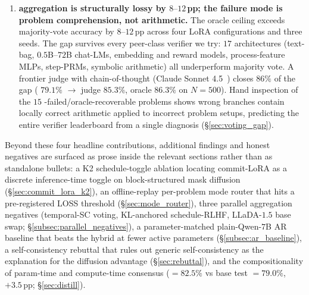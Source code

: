 \begin{enumerate}
          full-response training; full-response training alone
          (with last-block-only commit) adds $+0.0$\,pp.  Two
          design errors mask each other; block coverage is the
          dominant lever (\S\ref{sec:distill}).
    \item \textbf{\cmaj{} aggregation is structurally lossy by
          $8\text{--}12$\,pp; the failure mode is problem
          comprehension, not arithmetic.}  The oracle ceiling
          exceeds majority-vote accuracy by $8\text{--}12$\,pp
          across four LoRA configurations and three seeds.  The
          gap survives every peer-class verifier we try: $17$
          architectures (text-bag, $0.5$B--$72$B chat-LMs,
          embedding and reward models, process-feature MLPs,
          step-PRMs, symbolic arithmetic) all underperform
          majority vote.  A frontier judge with chain-of-thought
          (Claude Sonnet 4.5~\citep{anthropic2025sonnet}) closes
          $86\%$ of the gap (\cmaj{} $79.1\%$ $\to$ judge
          $85.3\%$, oracle $86.3\%$ on $N{=}500$).  Hand inspection
          of the $15$ \cmaj{}-failed/oracle-recoverable problems
          shows wrong branches contain locally correct arithmetic
          applied to incorrect problem setups, predicting the
          entire verifier leaderboard from a single diagnosis
          (\S\ref{sec:voting_gap}).
\end{enumerate}

Beyond these four headline contributions, additional findings
and honest negatives are surfaced as prose inside the relevant
sections rather than as standalone bullets: a K2 schedule-toggle
ablation locating commit-LoRA as a discrete inference-time toggle
on block-structured mask diffusion (\S\ref{sec:commit_lora_k2}),
an offline-replay per-problem mode router that hits a
pre-registered LOSS threshold (\S\ref{sec:mode_router}), three
parallel aggregation negatives (temporal-SC voting, KL-anchored
schedule-RLHF, LLaDA-$1.5$ base swap;
\S\ref{subsec:parallel_negatives}), a parameter-matched
plain-Qwen-$7$B AR baseline that beats the hybrid \cmajc{} at
fewer active parameters
(\S\ref{subsec:ar_baseline}), a  self-consistency
rebuttal that rules out generic self-consistency as the
explanation for the diffusion \cmaj{} advantage
(\S\ref{sec:rebuttal}), and the compositionality of param-time
and compute-time consensus (\cmajc{}$=82.5\%$ vs base test
\cmaj{}$=79.0\%$, $+3.5$\,pp; \S\ref{sec:distill}).

